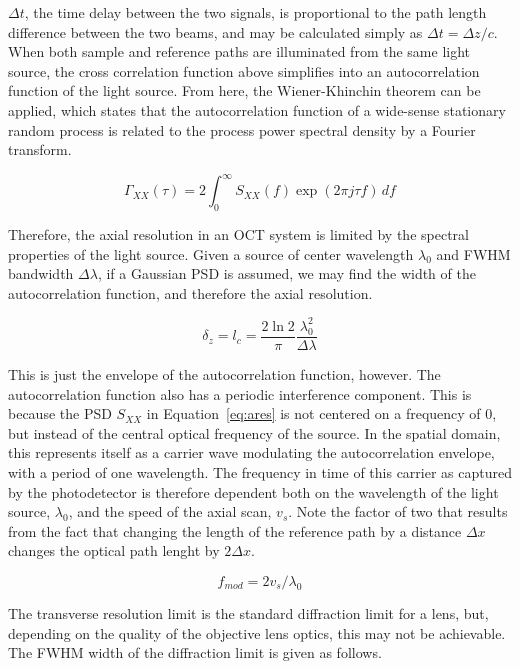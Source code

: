 $\Delta t$, the time delay between the two signals, is proportional to the path length difference between the two beams, and may be calculated simply as $\Delta t = \Delta z / c$. When both sample and reference paths are illuminated from the same light source, the cross correlation function above simplifies into an autocorrelation function of the light source. From here, the Wiener-Khinchin theorem can be applied, which states that the autocorrelation function of a wide-sense stationary random process is related to the process power spectral density by a Fourier transform.

\begin{equation}
\Gamma_{XX}(\tau) = 2 \int_{0}^\infty S_{XX}(f) \exp(2 \pi j \tau f) \,df
\end{equation}

Therefore, the axial resolution in an OCT system is limited by the spectral properties of the light source. Given a source of center wavelength $\lambda_0$ and FWHM bandwidth $\Delta \lambda$, if a Gaussian PSD is assumed, we may find the width of the autocorrelation function, and therefore the axial resolution. \cite{fercher}

\begin{equation} \label{eq:ares}
\delta_z = l_c = \frac{2 \ln{2}}{\pi} \frac{\lambda_0^2}{\Delta \lambda}
\end{equation}

This is just the envelope of the autocorrelation function, however. The autocorrelation function also has a periodic interference component. This is because the PSD $S_{XX}$ in Equation~\ref{eq:ares} is not centered on a frequency of 0, but instead of the central optical frequency of the source. In the spatial domain, this represents itself as a carrier wave modulating the autocorrelation envelope, with a period of one wavelength. The frequency in time of this carrier as captured by the photodetector is therefore dependent both on the wavelength of the light source, $\lambda_0$, and the speed of the axial scan, $v_s$. Note the factor of two that results from the fact that changing the length of the reference path by a distance $\Delta x$ changes the optical path lenght by $ 2 \Delta x$. \cite{fercher}

\begin{equation} \label{eq:carrier}
f_{mod} = 2 v_s / \lambda_0
\end{equation}

The transverse resolution limit is the standard diffraction limit for a lens, but, depending on the quality of the objective lens optics, this may not be achievable. The FWHM width of the diffraction limit is given as follows. \cite{hecht}

